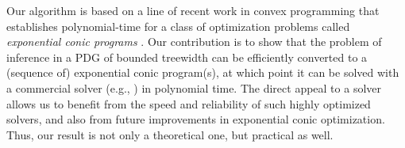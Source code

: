 Our algorithm
is based on a line of recent work in 
convex programming
that establishes
polynomial-time
for a class of optimization problems called \emph{exponential conic programs}
\parencite{badenbroek2021algorithm,skajaa2015homogeneous,nesterov1996infeasible}.
Our contribution is to show that the problem of inference in a PDG
of bounded treewidth
can be efficiently converted to a (sequence of) exponential conic program(s), at which point it can be solved with a commercial solver
(e.g., \textcite{mosek}) in polynomial time. 
The direct appeal to a solver allows us
to benefit from the speed and reliability of such highly optimized solvers, and also from future improvements in exponential conic optimization.
Thus, our result is not only a theoretical one, but practical as well.




